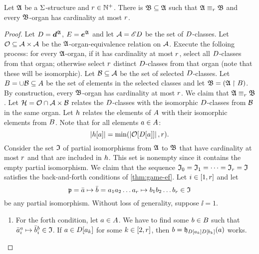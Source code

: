 \begin{lemma}\label{lem:monadic-organ-substructure}
Let $\mathfrak{A}$ be a $\mathrm{\Sigma}$-structure and $r \in \mathbb{N}^{+}$.
There is $\mathfrak{B} \subseteq \mathfrak{A}$ such that $\mathfrak{A} \equiv_{r} \mathfrak{B}$ and every
$\mathfrak{B}$-organ has cardinality at most $r$.
\end{lemma}
\begin{proof}
Let $D = \bm{d}^{\mathfrak{A}}$, $E = \bm{e}^{\mathfrak{A}}$ and
let $\mathcal{A} = {\mathscr{E}D}$ be the set of $D$-classes.
Let $\mathcal{O} \subseteq {\mathcal{A}\times\mathcal{A}}$ be the $\mathfrak{A}$-organ-equivalence relation
on $\mathcal{A}$.
Execute the folloing process: for every $\mathfrak{A}$-organ, if it has cardinality at
most $r$, select all $D$-classes from that organ; otherwise select $r$
distinct $D$-classes from that organ (note that these will be isomorphic).
Let $\mathcal{B} \subseteq \mathcal{A}$ be the set of selected $D$-classes.
Let $B = \cup \mathcal{B} \subseteq A$ be the set of elements in the selected
classes and let $\mathfrak{B} = (\mathfrak{A} \restriction B)$.
By construction, every $\mathfrak{B}$-organ has cardinality at most $r$.
We claim that $\mathfrak{A} \equiv_{r} \mathfrak{B}$.
Let $\mathcal{H} = \mathcal{O} \cap \mathcal{A}\times\mathcal{B}$ relates the $D$-classes with the
isomorphic $D$-classes from $\mathcal{B}$ in the same organ.
Let $h$ relates the elements of $A$ with their isomorphic elements from
$B$.
Note that for all elements $a \in A$:
\begin{equation}\label{eq:monadic-organ}
  \left|h[a]\right| = \min(\left|\mathcal{O}[D[a]]\right|, r).
\end{equation}
Consider the set $\mathfrak{I}$ of partial isomorphisms from $\mathfrak{A}$ to $\mathfrak{B}$ that
have cardinality at most $r$ and that are included in $h$. This set is
nonempty since it contains the empty partial isomorphism.
We claim that the sequence $\mathfrak{I}_{0} = \mathfrak{I}_{1} = \dots = \mathfrak{I}_{r} = \mathfrak{I}$
satisfies the back-and-forth conditions of \cref{thm:game-ef}.
Let $i \in [1,r]$ and let 
\[
  \mathfrak{p} = \bar{a} \mapsto \bar{b} =
  a_{1}a_{2}\dots a_{r} \mapsto b_{1}b_{2}\dots b_{r} \in \mathfrak{I}
\]
be any partial isomorphism.
Without loss of generality, suppose $\ii = 1$.
\begin{enumerate}
  \item For the forth condition, let $a \in A$. We have to find some $b
  \in B$ such that
  $\bar{a}_{i}^{a} \mapsto \bar{b}_{i}^{b} \in \mathfrak{I}$.
  If $a \in D[a_{k}]$ for some $k \in [2,r]$,
  then $b = \mathfrak{h}_{D[a_{k}]D[b_{k}]}(a)$ works.
  

\end{enumerate}
\end{proof}
